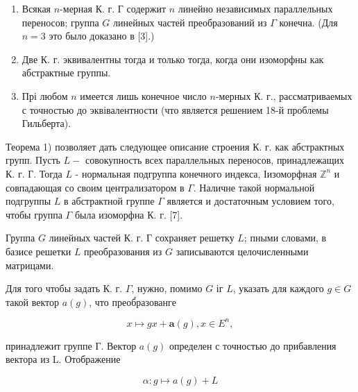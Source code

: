 \documentclass[10pt]{article}
\begin{document}
\begin{enumerate}

  \item Всякая $n$-мерная К. г. Г содержит $n$ линейно независимых параллельных переносов; группа $G$ линейных частей преобразований из $\Gamma$ конечна. (Для $n=3$ это было доказано в [3].)



  \item Две К. г. эквивалентны тогда и только тогда, когда они изоморфны как абстрактные группы.



  \item Прі любом $n$ имеется лишь конечное число $n$-мерных К. г., рассматриваемых с точностью до эквівалентности (что является решением 18-й проблемы Гильберта).



\end{enumerate}



Теорема 1) позволяет дать следующее описание строения К. г. как абстрактных групп. Пусть $L-$ совокупность всех параллельных переносов, принадлежащих К. г. Г. Тогда $L$ - нормальная подгруппа конечного индекса, Іизоморфная $\mathbb{Z}^{n}$ и совпадающая со своим централизатором в $\Gamma$. Наличне такой нормальной подгруппы $L$ в абстрактной группе $\Gamma$ является и достаточным условием того, чтобы группа $\Gamma$ была изоморфна К. г. [7].



Группа $G$ линейных частей К. г. Г сохраняет решетку $L$; пными словами, в базисе решетки $L$ преобразования из $G$ записываются целочисленными матрицами.



Для того чтобы задать К. г. $\Gamma$, нужно, помимо $G$ іг $L$, указать для каждого $g \in G$ такой вектор $a(g)$, что преоб́разованге



\[

x \longmapsto g x+\boldsymbol{a}(g), x \in E^{n},

\]



принадлежит группе Г. Вектор $a(g)$ определен с точностью до прибавления вектора из L. Отображение



\[

\alpha: g \longmapsto a(g)+L

\]
\end{document}
